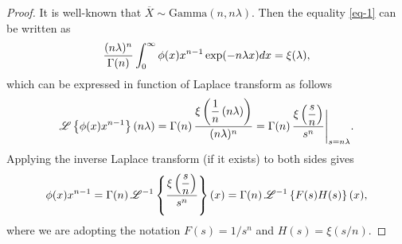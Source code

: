 \documentclass[10pt,a4paper]{amsart}
\begin{document}
\begin{proof}
	It is well-known that  $\overline{X}\sim\text{Gamma}(n,n\lambda)$. Then the equality \eqref{eq-1} can be written as
	\begin{align*}
		{(n\lambda)^n\over \Gamma(n)}
		\int_{0}^{\infty}
		\phi(x)
		x^{n-1}
		\exp(-n\lambda x)
		{\rm d}x
		=
		\xi(\lambda),
	\end{align*}
	which can be expressed in function of Laplace transform as follows
	\begin{align*}
		\mathscr{L}\left\{	\phi(x)
		x^{n-1}\right\}(n\lambda)
		=
		\Gamma(n)\,
		{\displaystyle \xi\left({1\over n} \, (n\lambda)\right)\over (n\lambda)^n}
		=
		\Gamma(n)\,
		{\displaystyle \xi\left({s\over n}\right)\over s^n}
		\Bigg\vert_{s=n\lambda}.
	\end{align*}
	Applying the inverse Laplace transform (if it exists) to both sides gives
	\begin{align}\label{main-identit-0}
		\phi(x)
		x^{n-1}
		=
		\Gamma(n)\,
		\mathscr{L}^{-1}\left\{	
		{\displaystyle \xi\left({s\over n}\right)\over s^n}
		\right\}
		(x)
		=
		\Gamma(n)\,
		\mathscr{L}^{-1}\left\{	
		F(s)H(s)
		\right\}
		(x),
	\end{align}	
	where we are adopting the notation $F(s)=1/s^n$ and $H(s)=\xi\left({s/n}\right)$. 
	

\end{proof}
\end{document}

